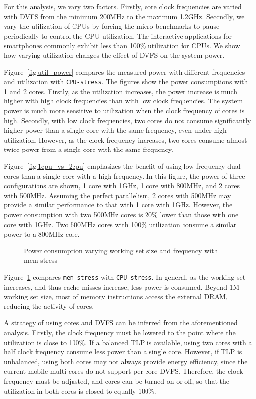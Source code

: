 For this analysis, we vary two factors. Firstly, core clock frequencies are varied with DVFS from
the minimum 200MHz to the maximum 1.2GHz. Secondly, we vary the utilization of CPUs by forcing
the micro-benchmarks to pause periodically to control the CPU utilization. The interactive
applications for smartphones commonly exhibit less than 100\% utilization for CPUs. We show how
varying utilization changes the effect of DVFS on the system power.

Figure~\ref{fig:util_power} compares the measured power with different frequencies and utilization
with {\tt CPU-stress}. The figures show the power consumptions with 1 and 2 cores. 
Firstly, as the utilization increases, the power increase is much higher
with high clock frequencies than with low clock frequencies. The system power is much more sensitive to
utilization when the clock frequency of cores is high.
Secondly, with low clock frequencies,
two cores do not consume significantly higher power than a single core with the same frequency, even under high utilization.
However, as the clock frequency increases, two cores consume almost twice power from a single core with
the same frequency.

Figure~\ref{fig:1cpu_vs_2cpu} emphasizes the benefit of using low frequency dual-cores than 
a single core with a high frequency. In this figure, the power of three configurations are 
shown, 1 core with 1GHz, 1 core with 800MHz, and 2 cores with 500MHz. Assuming the perfect
parallelism, 2 cores with 500MHz may provide a similar performance to that with 1 core with
1GHz. However, the power consumption with two 500MHz cores is 20\% lower than those with one core with 1GHz.
Two 500MHz cores with 100\% utilization consume a similar power to a 800MHz core. 

\begin{figure}[bt]
\begin{center}
\vspace{-0.25in}
\end{center}
\caption{Power consumption varying working set size and frequency with mem-stress}
\vspace{-0.2in}
\label{fig:util_power_stream}
\end{figure}

Figure~\ref{fig:util_power_stream} compares {\tt mem-stress} with {\tt CPU-stress}.
In general, as the working set increases, and thus cache misses increase, less power is consumed.
Beyond 1M working set size, most of memory instructions access the external DRAM, reducing
the activity of cores.

A strategy of using cores and DVFS can be inferred from the aforementioned analysis.
Firstly, the clock frequency must be lowered to the point where the utilization is close to 100\%. 
If a balanced TLP is available, using two cores with a half clock frequency consume less power than
a single core. However, if TLP is unbalanced, using both cores may not always provide energy 
efficiency, since the current mobile multi-cores do not support per-core DVFS. Therefore, 
the clock frequency must be adjusted, and cores can be turned on or off, so that 
the utilization in both cores is closed to equally 100\%.

